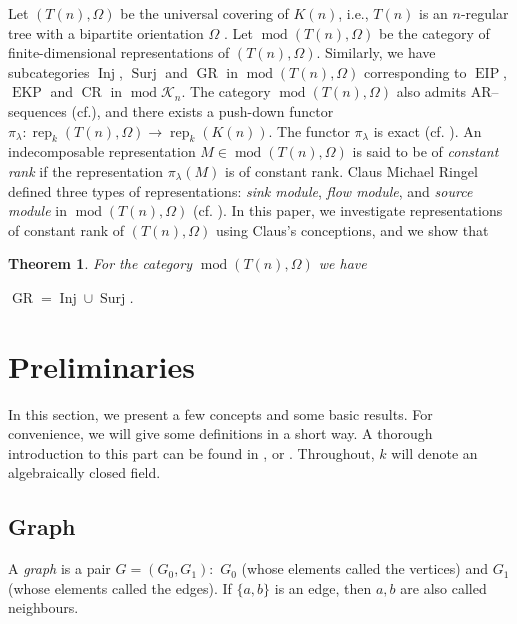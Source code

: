 \documentclass[a4paper,12pt]{amsart}
\newcommand{\cK}{\mathcal{K}}
\DeclareMathOperator{\rep}{rep}
\DeclareMathOperator{\modd}{mod}
\DeclareMathOperator{\EIP}{EIP}
\DeclareMathOperator{\Inj}{Inj}
\DeclareMathOperator{\Sur}{Surj}
\DeclareMathOperator{\EKP}{EKP}
\DeclareMathOperator{\GR}{GR}
\DeclareMathOperator{\CR}{CR}
\newtheorem{TheoremA}{Theorem}
\begin{document}
 
 Let  $(T(n),\Omega)$ be the universal covering of $K(n)$, i.e., $T(n)$ is  an $n$-regular tree  with a bipartite orientation $\Omega$ \cite[Section 7]{Daniel}. Let $\modd(T(n),\Omega)$ be the category of finite-dimensional representations of $(T(n),\Omega)$. Similarly, we have subcategories $\Inj$, $\Sur$ and $\GR$ in $\modd(T(n),\Omega)$ corresponding to $\EIP$, $\EKP$ and $\CR$ in $\modd\cK_n$. 
 The category $\modd(T(n),\Omega)$ also admits AR--sequences (cf.\cite[2.2]{Bongartz}), and  there exists a push-down functor $\pi_\lambda:\rep_k(T(n),\Omega)\rightarrow\rep_k(K(n))$.  The functor $\pi_\lambda$ is exact (cf. \cite{Daniel}).  An indecomposable representation $M\in \modd(T(n),\Omega)$ is said to be of \textit{constant rank} if the  representation $\pi_\lambda(M)$ is of constant rank. Claus Michael Ringel defined three types of representations: \textit{sink module}, \textit{flow module}, and \textit{source module} in $\modd(T(n),\Omega)$ (cf. \cite{Claus}). In this paper, we investigate  representations of constant rank of $(T(n),\Omega)$  using  Claus's conceptions, and we show that 
 
 \begin{TheoremA}
 
For the category  $\modd(T(n),\Omega)$  we have 
\begin{center}
 $\GR = \Inj\cup\Sur$.
\end{center}

\end{TheoremA} 
 


  









\section{Preliminaries}
In this section, we present a few concepts and some basic results.  For  convenience, we will give some definitions in a short way. A thorough introduction to this part can be found in  \cite[-]{Assem1}, \cite{Claus} or \cite{Daniel}. Throughout, $k$ will  denote an algebraically closed field.



\subsection{Graph}  A \textit{graph} is a pair $G=(G_0, G_1):$   $G_0$ (whose elements called the vertices) and $G_1$ (whose elements called the edges). If $\{a, b\}$ is an edge, then $a,b$ are also called neighbours.
\end{document}

